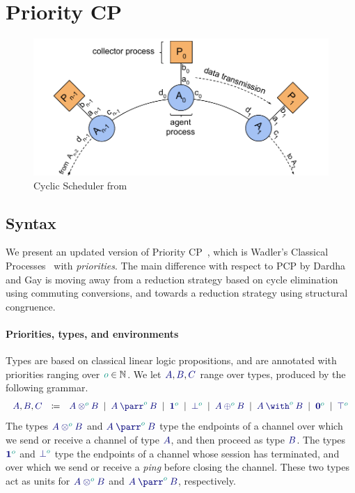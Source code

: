 \documentclass[main.tex]{subfiles}
\begin{document}
\section{Priority CP}

\begin{figure}[t]
  \centering
  \includegraphics[width=0.8\columnwidth]{scheduler}
  \vspace{-4mm}
  \caption{Cyclic Scheduler from \cite{dardha2018}}
  \label{fig:scheduler}
  \vspace{-4mm}
  \end{figure}

\subsection{Syntax}

We present an updated version of Priority CP~\cite[PCP]{dardha2018}, which is Wadler's Classical Processes~\cite[CP]{wadler2012} with \emph{priorities}.
The main difference with respect to PCP by Dardha and Gay \cite{dardha2018} is moving away from a reduction strategy based on cycle elimination using commuting conversions, and towards a reduction strategy using structural congruence.

\paragraph*{Priorities, types, and environments}
Types are based on classical linear logic propositions, and are annotated with priorities ranging over $\cs{o}\in\mathbb{N}$. We let $\ty{A}, \ty{B}, \ty{C}$ range over types, produced by the following grammar.
\[
\begin{array}{lcl}
  \ty{A}, \ty{B}, \ty{C}
  & \coloneqq & \ty{\tytens[\cs{o}]{A}{B}}
    \sep        \ty{\typarr[\cs{o}]{A}{B}}
    \sep        \ty{\tyone[\cs{o}]}
    \sep        \ty{\tybot[\cs{o}]}
    \sep        \ty{\typlus[\cs{o}]{A}{B}}
    \sep        \ty{\tywith[\cs{o}]{A}{B}}
    \sep        \ty{\tynil[\cs{o}]}
    \sep        \ty{\tytop[\cs{o}]}
\end{array}
\]
The types $\ty{\tytens[\cs{o}]{A}{B}}$ and $\ty{\typarr[\cs{o}]{A}{B}}$ type the endpoints of a channel over which we send or receive a channel of type $\ty{A}$, and then proceed as type $\ty{B}$.
The types $\ty{\tyone[\cs{o}]}$ and $\ty{\tybot[\cs{o}]}$ type the endpoints of a channel whose session has terminated, and over which we send or receive a \emph{ping} before closing the channel. These two types act as units for $\ty{\tytens[\cs{o}]{A}{B}}$ and $\ty{\typarr[\cs{o}]{A}{B}}$, respectively.
\end{document}

